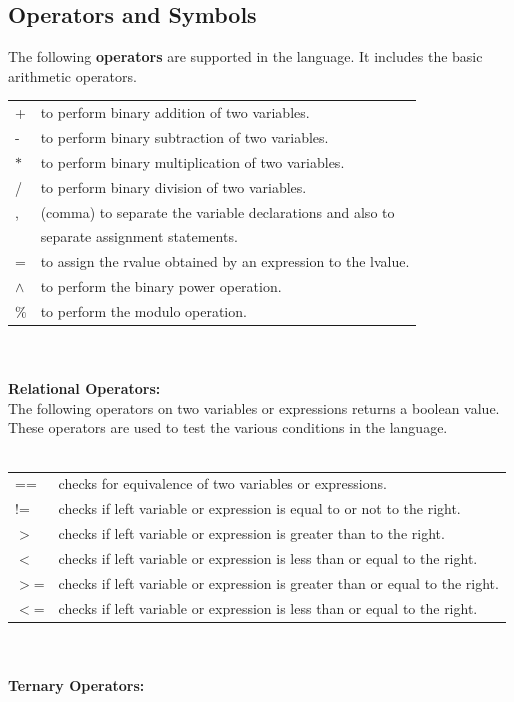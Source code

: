 \documentclass[12pt, oneside, a4paper]{article}
\begin{document}
\subsection{Operators and Symbols}
The following \textbf{operators} are supported in the language.  It includes the basic arithmetic operators.\\
\begin{tabular}{ll}
+ & to perform binary addition of two variables.\\
- & to perform binary subtraction of two variables.\\
$*$ & to perform binary multiplication of two variables.\\
/ & to perform binary division of two variables.\\
, & (comma) to separate the variable declarations and also to\\ &  separate assignment statements.\\
= & to assign the rvalue obtained by an expression to the lvalue.\\
$\wedge$ & to perform the binary power operation.\\
$\%$ & to perform the modulo operation.\\
\end{tabular}
\\\\\textbf{Relational Operators:}\\
The following operators on two variables or expressions returns a boolean value.  These operators are used to test the various conditions in the language.\\\\
\begin{tabular}{ll}
== & checks for equivalence of two variables or expressions.\\
!= & checks if left variable or expression is equal to or not to the right.\\
$>$ & checks if left variable or expression is greater than to the right.\\
$<$ & checks if left variable or expression is less than or equal to the right.\\
$>$= & checks if left variable or expression is greater than or equal to the right.\\
$<$= & checks if left variable or expression is less than or equal to the right.\\
\end{tabular}
\\\\\textbf{Ternary Operators:}\\
\end{document}
